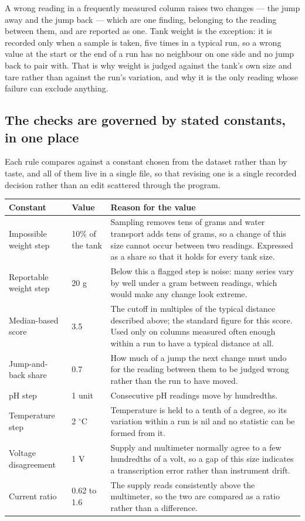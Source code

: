 \documentclass[11pt,a4paper]{article}
\begin{document}
A wrong reading in a frequently measured column raises two changes --- the jump away and the
jump back --- which are one finding, belonging to the reading between them, and are reported as
one. Tank weight is the exception: it is recorded only when a sample is taken, five times in a
typical run, so a wrong value at the start or the end of a run has no neighbour on one side and
no jump back to pair with. That is why weight is judged against the tank's own size and tare
rather than against the run's variation, and why it is the only reading whose failure can
exclude anything.

\subsection{The checks are governed by stated constants, in one place}

Each rule compares against a constant chosen from the dataset rather than by taste, and all of
them live in a single file, so that revising one is a single recorded decision rather than an
edit scattered through the program.

\begin{center}
\footnotesize
\begin{tabular}{@{}l l p{8.3cm}@{}}
\toprule
Constant & Value & Reason for the value \\
\midrule
Impossible weight step & 10\% of the tank & Sampling removes tens of grams and water
transport adds tens of grams, so a change of this size cannot occur between two readings.
Expressed as a share so that it holds for every tank size. \\
Reportable weight step & 20 g & Below this a flagged step is noise: many series vary by well
under a gram between readings, which would make any change look extreme. \\
Median-based score & 3.5 & The cutoff in multiples of the typical distance described
above; the standard figure for this score. Used only on columns measured often enough within a
run to have a typical distance at all. \\
Jump-and-back share & 0.7 & How much of a jump the next change must undo for the reading
between them to be judged wrong rather than the run to have moved. \\
pH step & 1 unit & Consecutive pH readings move by hundredths. \\
Temperature step & 2 $^{\circ}$C & Temperature is held to a tenth of a degree, so its
variation within a run is nil and no statistic can be formed from it. \\
Voltage disagreement & 1 V & Supply and multimeter normally agree to a few hundredths of a
volt, so a gap of this size indicates a transcription error rather than instrument drift. \\
Current ratio & 0.62 to 1.6 & The supply reads consistently above the multimeter, so the two
are compared as a ratio rather than a difference. \\
\bottomrule
\end{tabular}
\end{center}
\end{document}

